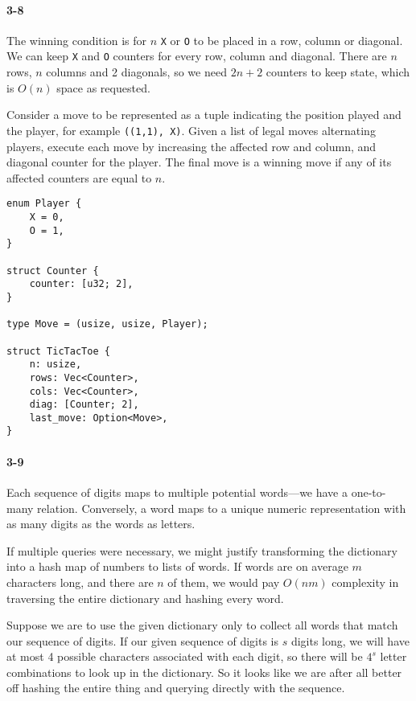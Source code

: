 \documentclass{report}
\begin{document}
\paragraph{3-8} The winning condition is for $n$ \lstinline!X! or \lstinline!O! to be placed in a row, column or diagonal. We can keep \lstinline!X! and \lstinline!O! counters for every row, column and diagonal. There are $n$ rows, $n$ columns and 2 diagonals, so we need $2n+2$ counters to keep state, which is $O(n)$ space as requested.

Consider a move to be represented as a tuple indicating the position played and the player, for example \lstinline!((1,1), X)!. Given a list of legal moves alternating players, execute each move by increasing the affected row and column, and diagonal counter for the player. The final move is a winning move if any of its affected counters are equal to $n$.

\begin{lstlisting}
enum Player {
    X = 0,
    O = 1,
}

struct Counter {
    counter: [u32; 2],
}

type Move = (usize, usize, Player);

struct TicTacToe {
    n: usize,
    rows: Vec<Counter>,
    cols: Vec<Counter>,
    diag: [Counter; 2],
    last_move: Option<Move>,
}
\end{lstlisting}

\paragraph{3-9} Each sequence of digits maps to multiple potential words---we have a one-to-many relation. Conversely, a word maps to a unique numeric representation with as many digits as the words as letters.

If multiple queries were necessary, we might justify transforming the dictionary into a hash map of numbers to lists of words. If words are on average $m$ characters long, and there are $n$ of them, we would pay $O(nm)$ complexity in traversing the entire dictionary and hashing every word.

Suppose we are to use the given dictionary only to collect all words that match our sequence of digits. If our given sequence of digits is $s$ digits long, we will have at most 4 possible characters associated with each digit, so there will be $4^s$ letter combinations to look up in the dictionary. So it looks like we are after all better off hashing the entire thing and querying directly with the sequence.
\end{document}
